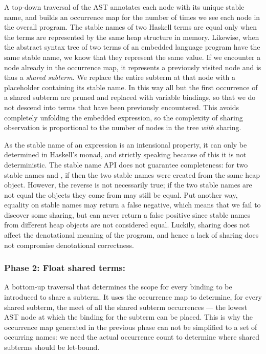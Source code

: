 A top-down traversal of the AST annotates each node
with its unique stable name, and builds an occurrence map for
the number of times we see each node in the overall program. The stable names of
two Haskell terms are equal only when the terms are represented by the same heap
structure in memory. Likewise, when the abstract syntax tree of two terms of an
embedded language program have the same stable name, we know that they represent
the same value. If we encounter a node already in the occurrence map, it represents a
previously visited node and is thus a \emph{shared subterm}. We replace the
entire subterm at that node with a placeholder containing its stable name. In
this way all but the first occurrence of a shared subterm are pruned and
replaced with variable bindings, so that we do not descend into terms that have
been previously encountered. This avoids completely unfolding the embedded
expression, so the complexity of sharing observation is proportional to the
number of nodes in the tree \emph{with} sharing.

As the stable name of an expression is an intensional property, it can only be
determined in Haskell's  monad, and strictly speaking because of this
it is not deterministic. The stable name API does not guarantee completeness:
for two stable names  and , if  then the
two stable names were created from the same heap object. However, the reverse is
not necessarily true; if the two stable names are not equal the objects they
come from may still be equal. Put another way, equality on stable names may
return a false negative, which means that we fail to discover some sharing, but
can never return a false positive since stable names from different heap objects
are not considered equal. Luckily, sharing does not affect the denotational
meaning of the program, and hence a lack of sharing does not compromise
denotational correctness.


\subsubsection*{Phase 2: Float shared terms:}

A bottom-up traversal that determines the scope for every binding to be
introduced to share a subterm. It uses the occurrence map to determine, for
every shared subterm, the meet of all the shared subterm occurrences --- the
lowest AST node at which the binding for the subterm can be placed. This is why
the occurrence map generated in the previous phase can not be simplified to
a set of occurring names: we need the actual occurrence count to determine where
shared subterms should be let-bound.


